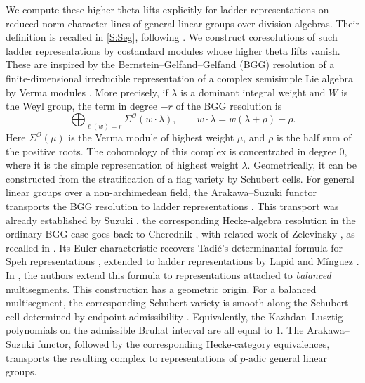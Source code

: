 \documentclass[10pt,a4paper]{article}
\theoremstyle{definition}
\theoremstyle{remark}
\numberwithin{equation}{section}
\begin{document}
We compute these higher theta lifts explicitly for ladder representations
on reduced-norm character lines of general linear groups over division
algebras. Their definition is
recalled in \cref{S:Seg}, following \cite{LM2014}.
We construct coresolutions of such ladder representations by
costandard modules whose higher theta lifts vanish.
These are inspired by the Bernstein--Gelfand--Gelfand (BGG) resolution
of a finite-dimensional irreducible representation of a complex
semisimple Lie algebra by Verma modules \cite{BGG1975}.
More precisely, if $\lambda$ is a dominant integral weight and $W$ is
the Weyl group, the term in degree $-r$ of the BGG resolution is
\[
 \bigoplus_{\ell(w)=r}\Sigma^{\mathcal O}(w\mathbin{\cdot}\lambda),
 \qquad w\mathbin{\cdot}\lambda=w(\lambda+\rho)-\rho.
\]
Here $\Sigma^{\mathcal O}(\mu)$ is the Verma module of highest weight $\mu$, and $\rho$
is the half sum of the positive roots. 
The cohomology of this complex
is concentrated in degree $0$, where it is the simple representation
of highest weight $\lambda$.
Geometrically, it can be constructed from the stratification of a flag
variety by Schubert cells.
For general linear groups over a non-archimedean
field, the Arakawa--Suzuki functor transports the BGG resolution to
ladder representations \cite[\S4]{BC2015}.
This transport was already established by Suzuki
\cite[Theorem~5.1.1]{Suzuki1998}, the corresponding Hecke-algebra
resolution in the ordinary BGG case goes back to Cherednik
\cite{Cherednik1987}, with related work of Zelevinsky
\cite{Zelevinsky1987}, as recalled in
\cite[Remark~5.1.2]{Suzuki1998}.
Its Euler characteristic recovers Tadi{\'c}'s determinantal formula for
Speh representations \cite{Tadic1995}, extended to ladder representations
by Lapid and M\'inguez \cite[Theorem~1]{LM2014}.
In \cite[Theorem~1.2(5)]{RegularLM2018},
the authors extend this formula to representations attached to \emph{balanced}
multisegments.
This construction has a geometric origin. For a balanced multisegment,
the corresponding Schubert variety is smooth along the Schubert cell
determined by endpoint admissibility
\cite[Theorem~1.2(4)]{RegularLM2018}. Equivalently, the
Kazhdan--Lusztig polynomials on the admissible Bruhat interval are all
equal to $1$.
The Arakawa--Suzuki functor, followed by the corresponding Hecke-category
equivalences, transports the resulting complex to representations of
$p$-adic general linear groups.
\end{document}
